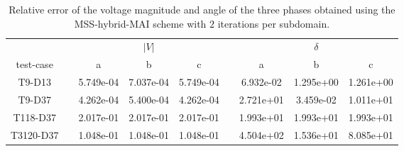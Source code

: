 \begin{table}
\renewcommand{\arraystretch}{1.3}
\centering
\label{}\hspace{2cm}\caption{Relative error of the voltage magnitude and angle of the three phases obtained using the MSS-hybrid-MAI scheme with $2$ iterations per subdomain. }
\begin{adjustbox}{width=1\textwidth} %
\small
\begin{tabular}{ccccccccc}
\toprule
{} && \multicolumn{3}{c}{$|V|$} && \multicolumn{3}{c}{$\delta$}  \\
\cmidrule{3-5}\cmidrule{7-9}
 test-case &&        a &        b &       c &&        a &       b &        c \\
\midrule
T9-D13       &&  5.749e-04 &  7.037e-04 &  5.749e-04 &&  6.932e-02 &  1.295e+00 &  1.261e+00 \\
T9-D37       &&  4.262e-04 &  5.400e-04 &  4.262e-04 &&  2.721e+01 &  3.459e-02 &  1.011e+01 \\
T118-D37     &&  2.017e-01 &  2.017e-01 &  2.017e-01 &&  1.993e+01 &  1.993e+01 &  1.993e+01 \\
T3120-D37    &&  1.048e-01 &  1.048e-01 &  1.048e-01 &&  4.504e+02 &  1.536e+01 &  8.085e+01 \\
\bottomrule
\end{tabular}
\end{adjustbox}
\end{table}
